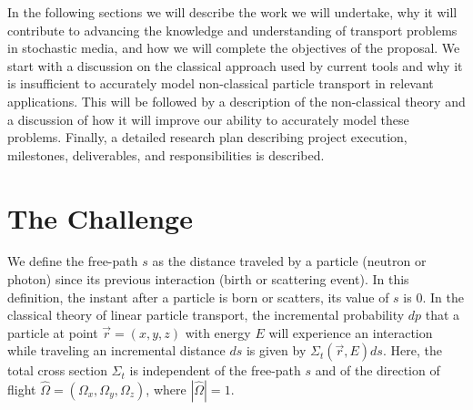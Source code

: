 \documentclass[12pt]{article}
\newcommand{\rvec}{\ensuremath{\vec{r}}}
\newcommand{\omvec}{\ensuremath{\hat{\Omega}}}
\begin{document}
In the following sections we will describe the work we will undertake, why it will contribute to advancing the knowledge and understanding of transport problems in stochastic media, and how we will complete the objectives of the proposal.
We start with a discussion on the classical approach used by current tools and why it is insufficient to accurately model non-classical particle transport in relevant applications.
This will be followed by a description of the non-classical theory and a discussion of
how it will improve our ability to accurately model these problems.
Finally, a detailed research plan describing project execution, milestones, deliverables, and responsibilities is described.

\section{The Challenge}

We define the free-path $s$ as the distance traveled by a particle (neutron or photon) since its previous interaction (birth or scattering event).
In this definition, the instant after a particle is born or scatters, its value of $s$ is 0.
In the classical theory of linear particle transport, the incremental probability $dp$ that a particle at point $\rvec = (x,y,z)$ with energy $E$ will experience an interaction while traveling an incremental distance $ds$ is given by $\Sigma_t(\rvec,E)ds$.
Here, the total cross section $\Sigma_t$ is independent of the free-path $s$ and of the direction of flight $\omvec = (\Omega_x,\Omega_y,\Omega_z)$, where $|\omvec|=1$.
\end{document}
